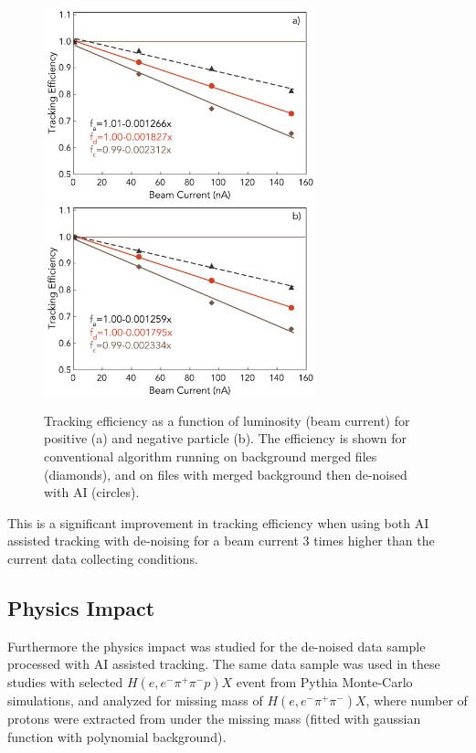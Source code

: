 \begin{figure}[!h]
\begin{center}
 \includegraphics[width=3.1in]{images/figure_lscan_pos_ai.pdf}
 \includegraphics[width=3.1in]{images/figure_lscan_neg_ai.pdf}
\caption {Tracking efficiency as a function of luminosity (beam current) for positive (a) and negative particle (b).  The efficiency is shown for
conventional algorithm running on background merged files (diamonds), and on files with merged background then de-noised with AI (circles).}
 \label{lscan::conv_dn_ai}
 \end{center}
\end{figure}

This is a significant improvement in tracking efficiency when using both AI assisted tracking with de-noising for a beam current 3 times higher than the current data collecting conditions. 

\subsection{Physics Impact}

Furthermore the physics impact was studied for the de-noised data sample processed with AI assisted tracking. The same data 
sample was used in these studies with selected $H(e,e^-\pi^+\pi^-p)X$ event from Pythia Monte-Carlo simulations, and analyzed for
missing mass of $H(e,e^-\pi^+\pi^-)X$, where number of protons were extracted from under the missing mass 
(fitted with gaussian function with polynomial background). 


